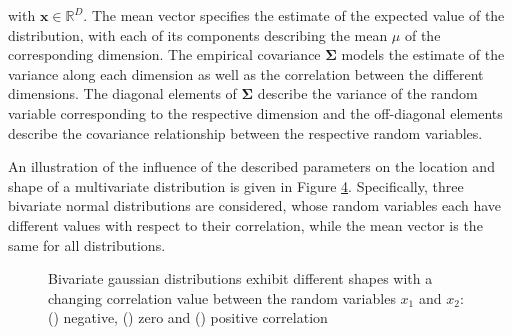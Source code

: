 \documentclass[../../../main.tex]{subfiles}
\begin{document}
with $\bm{x} \in \mathbb{R}^D$. The mean vector specifies the estimate of the expected value of the distribution, with each of its components describing the mean $\mu$ of the corresponding dimension. The empirical covariance $\bm{\Sigma}$ models the estimate of the variance along each dimension as well as the correlation between the different dimensions. The diagonal elements of $\bm{\Sigma}$ describe the variance of the random variable corresponding to the respective dimension and the off-diagonal elements describe the covariance relationship between the respective random variables. 

An illustration of the influence of the described parameters on the location and shape of a multivariate distribution is given in Figure \ref{fig:multiple_bivariate}. Specifically, three bivariate normal distributions are considered, whose random variables each have different values with respect to their correlation, while the mean vector is the same for all distributions.
 
\begin{figure}%
    \centering%
    \begin{subfigure}[b]{0.25\textwidth}%
        \centering\captionsetup{width=.8\linewidth}%
        \caption{}%
        \label{subfig:bivariate_neg}%
    \end{subfigure}%
    \begin{subfigure}[b]{0.33\textwidth}%
        \centering\captionsetup{width=.8\linewidth}%
        \caption{}%
        \label{subfig:bivariate_neutral}%
    \end{subfigure}%
    \begin{subfigure}[b]{0.33\textwidth}%
        \centering\captionsetup{width=.8\linewidth}%
        \caption{}%
        \label{subfig:bivariate_pos}%
    \end{subfigure}%
    \caption{Bivariate gaussian distributions exhibit different shapes with a changing correlation value between the random variables $x_1$ and $x_2$: () negative, () zero and () positive correlation}%
    \label{fig:multiple_bivariate}%
\end{figure}%
\end{document}

